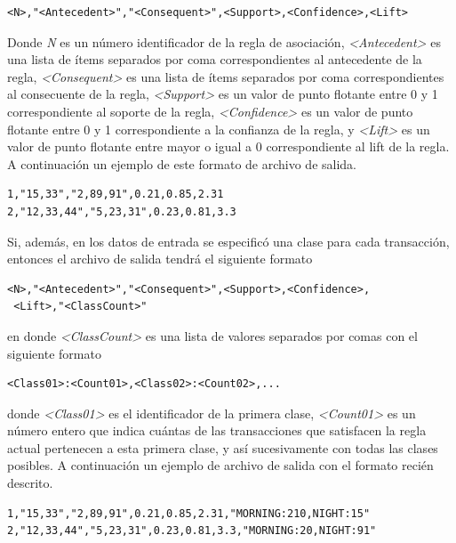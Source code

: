 \begin{lstlisting}[basicstyle=\ttfamily]
<N>,"<Antecedent>","<Consequent>",<Support>,<Confidence>,<Lift>
\end{lstlisting}

Donde \textit{N} es un número identificador de la regla de asociación, \textit{<Antecedent>} es una lista de ítems separados por coma correspondientes al antecedente de la regla, \textit{<Consequent>} es una lista de ítems separados por coma correspondientes al consecuente de la regla, \textit{<Support>} es un valor de punto flotante entre 0 y 1 correspondiente al soporte de la regla, \textit{<Confidence>} es un valor de punto flotante entre 0 y 1 correspondiente a la confianza de la regla, y \textit{<Lift>} es un valor de punto flotante entre mayor o igual a 0 correspondiente al lift de la regla. A continuación un ejemplo de este formato de archivo de salida.

\begin{lstlisting}[basicstyle=\ttfamily]
1,"15,33","2,89,91",0.21,0.85,2.31
2,"12,33,44","5,23,31",0.23,0.81,3.3
\end{lstlisting}

Si, además, en los datos de entrada se especificó una clase para cada transacción, entonces el archivo de salida tendrá el siguiente formato

\begin{lstlisting}[basicstyle=\ttfamily]
<N>,"<Antecedent>","<Consequent>",<Support>,<Confidence>,
 <Lift>,"<ClassCount>"
\end{lstlisting}

en donde \textit{<ClassCount>} es una lista de valores separados por comas con el siguiente formato

\begin{lstlisting}[basicstyle=\ttfamily]
<Class01>:<Count01>,<Class02>:<Count02>,...
\end{lstlisting}

donde \textit{<Class01>} es el identificador de la primera clase, \textit{<Count01>} es un número entero que indica cuántas de las transacciones que satisfacen la regla actual pertenecen a esta primera clase, y así sucesivamente con todas las clases posibles. A continuación un ejemplo de archivo de salida con el formato recién descrito.

\begin{lstlisting}[basicstyle=\ttfamily]
1,"15,33","2,89,91",0.21,0.85,2.31,"MORNING:210,NIGHT:15"
2,"12,33,44","5,23,31",0.23,0.81,3.3,"MORNING:20,NIGHT:91"
\end{lstlisting}


